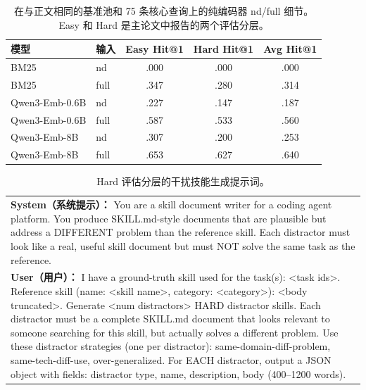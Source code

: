 \documentclass[11pt,UTF8,fontset=fandol]{ctexart}
\makeatletter
\newcommand{\Hit}{Hit@1}
\makeatother
\begin{document}
\begin{table}[H]\centering
\caption{在与正文相同的基准池和 75 条核心查询上的纯编码器 nd/full 细节。Easy 和 Hard 是主论文中报告的两个评估分层。}
\begin{tabular}{llccc}
\toprule
模型 & 输入 & Easy \Hit{} & Hard \Hit{} & Avg \Hit{} \\ \midrule
BM25 & nd & .000 & .000 & .000 \\
BM25 & full & .347 & .280 & .314 \\
Qwen3-Emb-0.6B & nd & .227 & .147 & .187 \\
Qwen3-Emb-0.6B & full & .587 & .533 & .560 \\
Qwen3-Emb-8B & nd & .307 & .200 & .253 \\
Qwen3-Emb-8B & full & .653 & .627 & .640 \\
\bottomrule
\end{tabular}
\label{tab:9}
\end{table}

\begin{table}[H]\centering
\caption{Hard 评估分层的干扰技能生成提示词。}
\begin{tabular}{p{14cm}}
\toprule
\textbf{System（系统提示）：} You are a skill document writer for a coding agent platform. You produce SKILL.md-style documents that are plausible but address a DIFFERENT problem than the reference skill. Each distractor must look like a real, useful skill document but must NOT solve the same task as the reference. \\[0.4em]
\textbf{User（用户）：} I have a ground-truth skill used for the task(s): {\textless}task ids{\textgreater}. Reference skill (name: {\textless}skill name{\textgreater}, category: {\textless}category{\textgreater}): {\textless}body truncated{\textgreater}. Generate {\textless}num distractors{\textgreater} HARD distractor skills. Each distractor must be a complete SKILL.md document that looks relevant to someone searching for this skill, but actually solves a different problem. Use these distractor strategies (one per distractor): same-domain-diff-problem, same-tech-diff-use, over-generalized. For EACH distractor, output a JSON object with fields: distractor type, name, description, body (400--1200 words). \\
\bottomrule
\end{tabular}
\label{tab:10}
\end{table}
\end{document}
